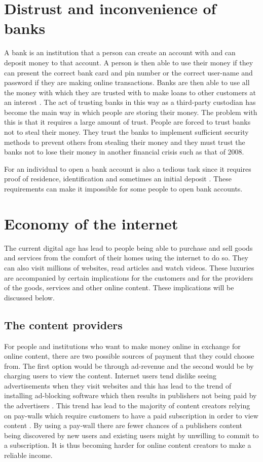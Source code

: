 

\section{Distrust and inconvenience of banks}
A bank is an institution that a person can create an account with and can deposit money to that account. A person is then able to use their money if they can present the correct bank card and pin number or the correct user-name and password if they are making online transactions. Banks are then able to use all the money with which they are trusted with to make loans to other customers at an interest \parencite{banks}. The act of trusting banks in this way as a third-party custodian has become the main way in which people are storing their money. The problem with this is that it requires a large amount of trust. People are forced to trust banks not to steal their money. They trust the banks to implement sufficient security methods to prevent others from stealing their money and they must trust the banks not to lose their money in another financial crisis such as that of 2008.

For an individual to open a bank account is also a tedious task since it requires proof of residence, identification and sometimes an initial deposit \parencite{bank_req}. These requirements can make it impossible for some people to open bank accounts.

\section{Economy of the internet}

The current digital age has lead to people being able to purchase and sell goods and services from the comfort of their homes using the internet to do so. They can also visit millions of websites, read articles and watch videos. These luxuries are accompanied by certain implications for the customers and for the providers of the goods, services and other online content. These implications will be discussed below.

\subsection{The content providers}
For people and institutions who want to make money online in exchange for online content, there are two possible sources of payment that they could choose from. The first option would be through ad-revenue and the second would be by charging users to view the content. 
Internet users tend dislike seeing advertisements when they visit websites and this has lead to the trend of installing ad-blocking software which then results in publishers not being paid by the advertisers \parencite{ad_block}. This trend has lead to the majority of content creators relying on pay-walls which require customers to have a paid subscription in order to view content \parencite{pay_wall}. By using a pay-wall there are fewer chances of a publishers content being discovered by new users and existing users might by unwilling to commit to a subscription. It is thus becoming harder for online content creators to make a reliable income.


